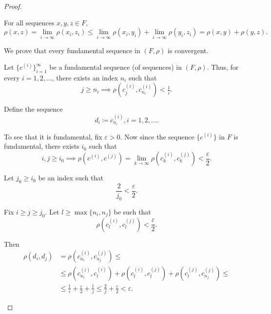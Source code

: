 \begin{proof}
\begin{defenum}
\begin{description}
       For all sequences \( x, y, z \in F \),
      \begin{equation*}
        \rho(x, z) = \lim_{i \to \infty} \rho(x_i, z_i) \leq \lim_{i \to \infty} \rho(x_i, y_i) + \lim_{i \to \infty} \rho(y_i, z_i) = \rho(x, y) + \rho(y, z).
      \end{equation*}
    \end{description}

     We prove that every fundamental sequence in \( (F, \rho) \) is convergent.

    Let \( \{ c^{(i)} \}_{i=1}^\infty \) be a fundamental sequence (of sequences) in \( (F, \rho) \). Thus, for every \( i = 1, 2, \ldots \), there exists an index \( n_i \) such that
    \begin{equation*}
      j \geq n_i \implies \rho(c_j^{(i)}, c_{n_i}^{(i)}) < \tfrac 1 i.
    \end{equation*}

    Define the sequence
    \begin{equation*}
      d_i \coloneqq c_{n_i}^{(i)}, i = 1, 2, \ldots.
    \end{equation*}

    To see that it is fundamental, fix \( \varepsilon > 0 \). Now since the sequence \( \{ c^{(i)} \} \) in \( F \) is fundamental, there exists \( i_0 \) such that
    \begin{equation*}
      i, j \geq i_0 \implies \rho(c^{(i)}, c^{(j)}) = \lim_{k \to \infty} \rho(c_k^{(i)}, c_k^{(j)}) < \frac \varepsilon 2.
    \end{equation*}

    Let \( j_0 \geq i_0 \) be an index such that
    \begin{equation*}
      \frac 2 {j_0} < \frac \varepsilon 2.
    \end{equation*}

    Fix \( i \geq j \geq j_0 \). Let \( l \geq \max \{ n_i, n_j \} \) be such that
    \begin{equation*}
      \rho(c_l^{(i)}, c_l^{(j)}) < \frac \varepsilon 2.
    \end{equation*}

    Then
    \begin{align*}
      \rho(d_i, d_j)
      &=
      \rho(c_{n_i}^{(i)}, c_{n_j}^{(j)})
      \leq \\ &\leq
      \rho(c_{n_i}^{(i)}, c_l^{(i)}) + \rho(c_l^{(i)}, c_l^{(j)}) + \rho(c_l^{(j)}, c_{n_j}^{(j)})
      \leq \\ &\leq
      \frac 1 i + \frac \varepsilon 2 + \frac 1 j
      \leq
      \frac 2 j + \frac \varepsilon 2
      <
      \varepsilon.
    \end{align*}


\end{defenum}
\end{proof}
